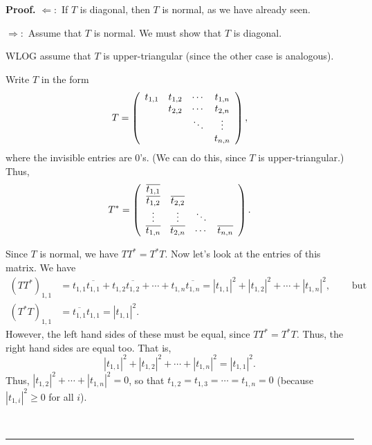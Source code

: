 \documentclass[numbers=enddot,12pt,final,onecolumn,notitlepage]{scrartcl}%
\numberwithin{exer}{subsection}
\theoremstyle{definition}
\newenvironment{proof}[1][Proof]{\noindent\textbf{#1.} }{\ \rule{0.5em}{0.5em}}
\begin{document}
\begin{proof}
$\Longleftarrow:$ If $T$ is diagonal, then $T$ is normal, as we have already seen.

$\Longrightarrow:$ Assume that $T$ is normal. We must show that $T$ is diagonal.

WLOG assume that $T$ is upper-triangular (since the other case is analogous). 

Write $T$ in the form%
\[
T=\left(
\begin{array}
[c]{cccc}%
t_{1,1} & t_{1,2} & \cdots & t_{1,n}\\
& t_{2,2} & \cdots & t_{2,n}\\
&  & \ddots & \vdots\\
&  &  & t_{n,n}%
\end{array}
\right)  ,
\]
where the invisible entries are $0$'s. (We can do this, since $T$ is
upper-triangular.) Thus,%
\[
T^{\ast}=\left(
\begin{array}
[c]{cccc}%
\overline{t_{1,1}} &  &  & \\
\overline{t_{1,2}} & \overline{t_{2,2}} &  & \\
\vdots & \vdots & \ddots & \\
\overline{t_{1,n}} & \overline{t_{2,n}} & \cdots & \overline{t_{n,n}}%
\end{array}
\right)  .
\]


Since $T$ is normal, we have $TT^{\ast}=T^{\ast}T$. Now let's look at the
entries of this matrix. We have%
\begin{align*}
\left(  TT^{\ast}\right)  _{1,1}  & =t_{1,1}\overline{t_{1,1}}+t_{1,2}%
\overline{t_{1,2}}+\cdots+t_{1,n}\overline{t_{1,n}}=\left\vert t_{1,1}%
\right\vert ^{2}+\left\vert t_{1,2}\right\vert ^{2}+\cdots+\left\vert
t_{1,n}\right\vert ^{2},\ \ \ \ \ \ \ \ \ \ \text{but}\\
\left(  T^{\ast}T\right)  _{1,1}  & =\overline{t_{1,1}}t_{1,1}=\left\vert
t_{1,1}\right\vert ^{2}.
\end{align*}
However, the left hand sides of these must be equal, since $TT^{\ast}=T^{\ast
}T$. Thus, the right hand sides are equal too. That is,%
\[
\left\vert t_{1,1}\right\vert ^{2}+\left\vert t_{1,2}\right\vert ^{2}%
+\cdots+\left\vert t_{1,n}\right\vert ^{2}=\left\vert t_{1,1}\right\vert ^{2}.
\]
Thus, $\left\vert t_{1,2}\right\vert ^{2}+\cdots+\left\vert t_{1,n}\right\vert
^{2}=0$, so that $t_{1,2}=t_{1,3}=\cdots=t_{1,n}=0$ (because $\left\vert
t_{1,i}\right\vert ^{2}\geq0$ for all $i$).


\end{proof}
\end{document}
